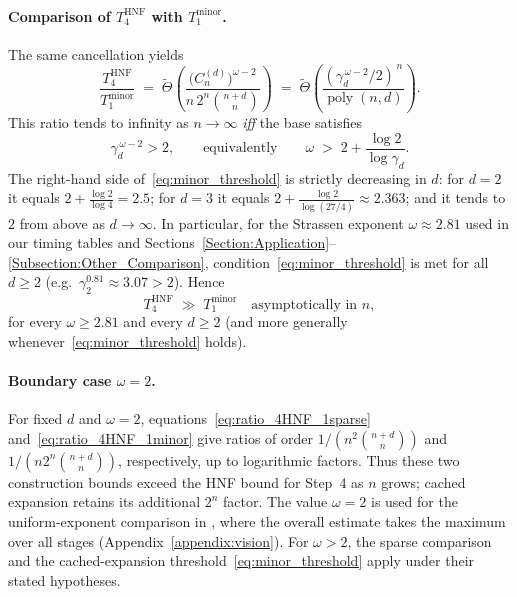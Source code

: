 \paragraph{Comparison of $T_{4}^{\mathrm{HNF}}$ with $T_{1}^{\mathrm{minor}}$.}
The same cancellation yields
\begin{equation}\label{eq:ratio_4HNF_1minor}
	\frac{T_{4}^{\mathrm{HNF}}}{T_{1}^{\mathrm{minor}}}
	\;=\; \widetilde{\Theta}\!\left(
	\frac{\bigl(C_n^{(d)}\bigr)^{\omega-2}}{n\,2^n\binom{n+d}{n}}
	\right)
	\;=\; \widetilde{\Theta}\!\left(
	\frac{(\gamma_d^{\,\omega-2}/2)^{\,n}}{\operatorname{poly}(n,d)}
	\right).
\end{equation}
This ratio tends to infinity as $n\to\infty$ \emph{iff} the base satisfies
\begin{equation}\label{eq:minor_threshold}
	\gamma_d^{\,\omega-2}>2,
	\qquad\text{equivalently}\qquad
	\omega \;>\; 2+\frac{\log 2}{\log \gamma_d}.
\end{equation}
The right-hand side of~\eqref{eq:minor_threshold} is strictly decreasing in $d$: for $d=2$ it equals $2+\tfrac{\log 2}{\log 4}=2.5$; for $d=3$ it equals $2+\tfrac{\log 2}{\log(27/4)}\approx 2.363$; and it tends to $2$ from above as $d\to\infty$. In particular, for the Strassen exponent $\omega\approx 2.81$ used in our timing tables and Sections~\ref{Section:Application}--\ref{Subsection:Other_Comparison}, condition~\eqref{eq:minor_threshold} is met for all $d\ge 2$ (e.g.\ $\gamma_2^{0.81}\approx 3.07>2$). Hence
\[
T_{4}^{\mathrm{HNF}} \;\gg\; T_{1}^{\mathrm{minor}}\quad\text{asymptotically in }n,
\]
for every $\omega\ge 2.81$ and every $d\ge 2$ (and more generally whenever~\eqref{eq:minor_threshold} holds).

\paragraph{Boundary case $\omega=2$.}
For fixed $d$ and $\omega=2$, equations~\eqref{eq:ratio_4HNF_1sparse} and~\eqref{eq:ratio_4HNF_1minor} give ratios of order $1/(n^2\binom{n+d}{n})$ and $1/(n2^n\binom{n+d}{n})$, respectively, up to logarithmic factors. Thus these two construction bounds exceed the HNF bound for Step~4 as $n$ grows; cached expansion retains its additional $2^n$ factor. The value $\omega=2$ is used for the uniform-exponent comparison in \vision, where the overall estimate takes the maximum over all stages (Appendix~\ref{appendix:vision}). For $\omega>2$, the sparse comparison and the cached-expansion threshold~\eqref{eq:minor_threshold} apply under their stated hypotheses.

